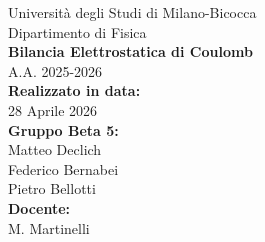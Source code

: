 \documentclass[a4paper,12pt]{article}
\begin{document}
\begin{titlepage}
    \begin{center}
        \vspace*{1cm}
        
        {\Large Università degli Studi di Milano-Bicocca}\\
        {\Large Dipartimento di Fisica }\\
        \vspace{0.5cm}
        {\Huge \textbf{Bilancia Elettrostatica di Coulomb}}\\
        
        \vspace{1.5cm}
        {\large A.A. 2025-2026}\\
        
        \vspace{2cm}
        {\large \textbf{Realizzato in data:}}\\
        {\large 28 Aprile 2026}\\
        
        \vspace{1.5cm}
        {\large \textbf{Gruppo Beta 5:}}\\
        {\large Matteo Declich}\\
        {\large Federico Bernabei}\\
        {\large Pietro Bellotti}\\
        
        \vspace{1.5cm}
        {\large \textbf{Docente:}}\\
        {\large M. Martinelli}\\
        
        \vfill
        \vspace{0.8cm}
        
    \end{center}
\end{titlepage}

\tableofcontents 
\newpage


\printbibliography[heading=bibintoc]
\end{document}
